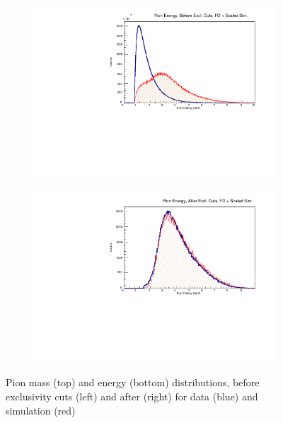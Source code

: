 \begin{figure}[!htb]
\begin{subfigure}{.5\textwidth}
            \end{subfigure}
            \begin{subfigure}{.5\textwidth}
                \centering
                \includegraphics[width=1\textwidth]{figures/Simulation/exclusivity/hist_pion_energy_prexcut_fd_Double.pdf}
            \end{subfigure}%
            \begin{subfigure}{.5\textwidth}
                \centering
                \includegraphics[width=1\textwidth]{figures/Simulation/exclusivity/hist_pion_energy_excut_fd_Double.pdf}
            \end{subfigure}
            \caption[short]{Pion mass (top) and energy (bottom) distributions, before exclusivity cuts (left) and after (right) for data (blue) and simulation (red)}
        \end{figure}

